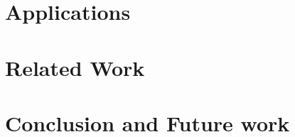 \documentclass[11pt]{ucthesis}
\begin{document}
\chapter{Applications}
\label{chapter:app}



\chapter{Related Work}
\label{chapter:related}


\chapter{Conclusion and Future work}
\label{chapter:summary}


%


  


\end{document}
